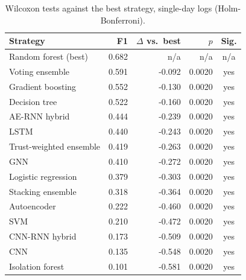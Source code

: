 \begin{table}[H]
\centering
\small
\begin{tabular}{lrrrc}
\toprule
Strategy & F1 & $\Delta$ vs.\ best & $p$ & Sig. \\
\midrule
Random forest (best) & 0.682 & n/a & n/a & n/a \\
\midrule
Voting ensemble & 0.591 & -0.092 & 0.0020 & yes \\
Gradient boosting & 0.552 & -0.130 & 0.0020 & yes \\
Decision tree & 0.522 & -0.160 & 0.0020 & yes \\
AE-RNN hybrid & 0.444 & -0.239 & 0.0020 & yes \\
LSTM & 0.440 & -0.243 & 0.0020 & yes \\
Trust-weighted ensemble & 0.419 & -0.263 & 0.0020 & yes \\
GNN & 0.410 & -0.272 & 0.0020 & yes \\
Logistic regression & 0.379 & -0.303 & 0.0020 & yes \\
Stacking ensemble & 0.318 & -0.364 & 0.0020 & yes \\
Autoencoder & 0.222 & -0.460 & 0.0020 & yes \\
SVM & 0.210 & -0.472 & 0.0020 & yes \\
CNN-RNN hybrid & 0.173 & -0.509 & 0.0020 & yes \\
CNN & 0.135 & -0.548 & 0.0020 & yes \\
Isolation forest & 0.101 & -0.581 & 0.0020 & yes \\
\bottomrule
\end{tabular}
\caption{Wilcoxon tests against the best strategy, single-day logs (Holm-Bonferroni).}
\label{tab:significance-single-day}
\end{table}
